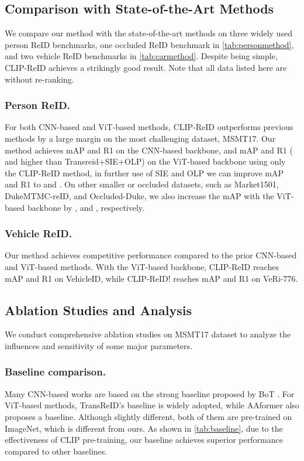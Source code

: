 \documentclass[letterpaper]{article} \usepackage{aaai23}  \usepackage{times}  \usepackage{helvet}  \usepackage{courier}  \usepackage[hyphens]{url}  \usepackage{graphicx} \urlstyle{rm} \def\UrlFont{\rm}  \usepackage{natbib}  \usepackage{caption} \frenchspacing  \setlength{\pdfpagewidth}{8.5in}  \setlength{\pdfpageheight}{11in}  \usepackage{algorithm}
\begin{document}
\subsection{Comparison with State-of-the-Art Methods}
We compare our method with the state-of-the-art methods on three widely used person ReID benchmarks, one occluded ReID benchmark in \cref{tab:personmethod},  and two vehicle ReID benchmarks in \cref{tab:carmethod}. Despite being simple, CLIP-ReID achieves a strikingly good result. Note that all data listed here are without re-ranking.
\subsubsection{Person ReID.}
For both CNN-based and ViT-based methods, CLIP-ReID outperforms previous methods by a large margin on the most challenging dataset, MSMT17. Our method achieves  mAP and  R1 on the CNN-based backbone, and  mAP and  R1 ( and  higher than Transreid+SIE+OLP) on the ViT-based backbone using only the CLIP-ReID method, in further use of SIE and OLP we can improve mAP and R1 to  and . On other smaller or occluded datasets, such as Market1501, DukeMTMC-reID, and Occluded-Duke, we also increase the mAP with the ViT-based backbone by ,  and , respectively.

\subsubsection{Vehicle ReID.}
Our method achieves competitive performance compared to the prior CNN-based and ViT-based methods. With the ViT-based backbone, CLIP-ReID reaches  mAP and  R1 on VehicleID, while CLIP-ReID! reaches  mAP and  R1 on VeRi-776.

\subsection{Ablation Studies and Analysis}
We conduct comprehensive ablation studies on MSMT17 dataset to analyze the influences and sensitivity of some major parameters. 
\subsubsection{Baseline comparison.}
Many CNN-based works are based on the strong baseline proposed by BoT \cite{strongbaseline}. For ViT-based methods, TransReID's baseline is widely adopted, while AAformer also proposes a baseline. Although slightly different, both of them are pre-trained on ImageNet, which is different from ours. As shown in \cref{tab:baseline}, due to the effectiveness of CLIP pre-training, our baseline achieves superior performance compared to other baselines.
\end{document}
